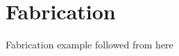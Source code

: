 \documentclass[../report.tex]{subfiles}
\begin{document}
	
	
\chapter{Fabrication}
	Fabrication example followed from here \cite{errando-herranz_low-power_2015}
\end{document}
